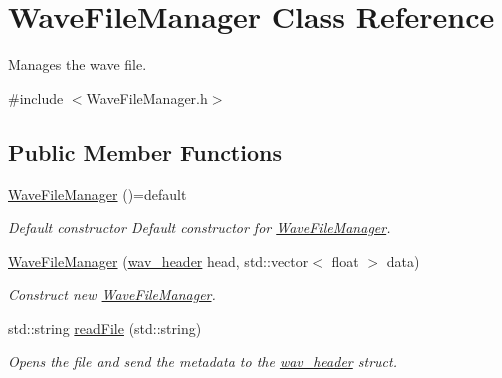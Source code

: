 \hypertarget{classWaveFileManager}{}\section{Wave\+File\+Manager Class Reference}
\label{classWaveFileManager}


Manages the wave file.  




{\ttfamily \#include $<$Wave\+File\+Manager.\+h$>$}

\subsection*{Public Member Functions}
\begin{DoxyCompactItemize}
\item 
\mbox{\label{classWaveFileManager_a2a862ef3321ffd9e68738d5e6f453f0e}} 
\hyperlink{classWaveFileManager_a2a862ef3321ffd9e68738d5e6f453f0e}{Wave\+File\+Manager} ()=default
\begin{DoxyCompactList}\small\item\em Default constructor Default constructor for \hyperlink{classWaveFileManager}{Wave\+File\+Manager}. \end{DoxyCompactList}\item 
\hyperlink{classWaveFileManager_ae729ebd19c43beb6779abe347a501029}{Wave\+File\+Manager} (\hyperlink{structwav__header}{wav\+\_\+header} head, std\+::vector$<$ float $>$ data)
\begin{DoxyCompactList}\small\item\em Construct new \hyperlink{classWaveFileManager}{Wave\+File\+Manager}. \end{DoxyCompactList}\item 
\mbox{\label{classWaveFileManager_a877855cb21b018f869e8416d2be57020}} 
std\+::string \hyperlink{classWaveFileManager_a877855cb21b018f869e8416d2be57020}{read\+File} (std\+::string)
\begin{DoxyCompactList}\small\item\em Opens the file and send the metadata to the \hyperlink{structwav__header}{wav\+\_\+header} struct. \end{DoxyCompactList}\item 
\mbox{\label{classWaveFileManager_aa0a65c65925e1074cb8ad2d35734f4fc}} 

\end{DoxyCompactItemize}
